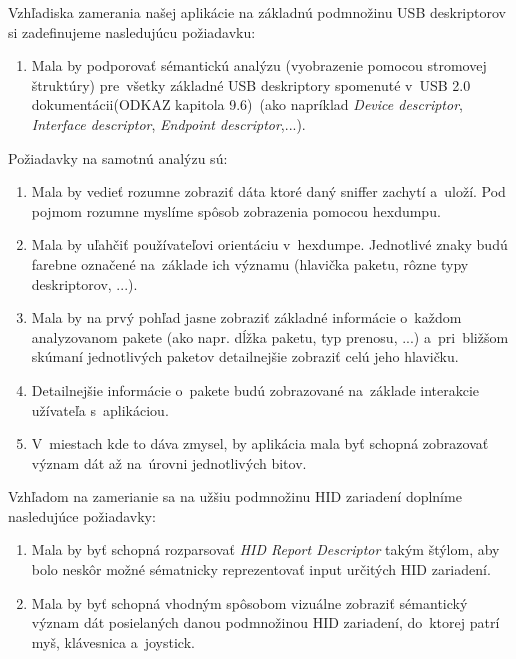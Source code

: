 Vzhľadiska zamerania našej aplikácie na základnú podmnožinu USB deskriptorov si zadefinujeme nasledujúcu požiadavku:
\begin{enumerate}[label=\textbf{P\arabic*},resume]
	\item \label{uvod:poz:deskriptory} Mala by podporovať sémantickú analýzu (vyobrazenie pomocou stromovej štruktúry) pre~všetky základné USB deskriptory spomenuté v~USB 2.0 dokumentácii(ODKAZ kapitola 9.6)~(ako napríklad \textit{Device descriptor}, \textit{Interface descriptor}, \textit{Endpoint descriptor},...).
\end{enumerate}

Požiadavky na samotnú analýzu sú:
\begin{enumerate}[label=\textbf{P\arabic*},resume]
	\item \label{uvod:poz:hexdump} Mala by vedieť rozumne zobraziť dáta ktoré daný sniffer zachytí a~uloží. Pod pojmom rozumne myslíme spôsob zobrazenia pomocou hexdumpu.
	\item \label{uvod:poz:data_highlight} Mala by uľahčiť používateľovi orientáciu v~hexdumpe. Jednotlivé znaky budú farebne označené na~základe ich významu (hlavička paketu, rôzne typy deskriptorov, ...).
	\item \label{uvod:poz:zobrazenie_paketov} Mala by na prvý pohľad jasne zobraziť základné informácie o~každom analyzovanom pakete (ako napr. dĺžka paketu, typ prenosu, ...) a~pri~bližšom skúmaní jednotlivých paketov detailnejšie zobraziť celú jeho hlavičku.
	\item \label{uvod:poz:paket_detail} Detailnejšie informácie o~pakete budú zobrazované na~základe interakcie užívateľa s~aplikáciou.
	\item \label{uvod:poz:show_bits} V~miestach kde to dáva zmysel, by aplikácia mala byť schopná zobrazovať význam dát až na~úrovni jednotlivých bitov.
\end{enumerate}

Vzhľadom na zamerianie sa na užšiu podmnožinu HID zariadení doplníme nasledujúce požiadavky:
\begin{enumerate}[label=\textbf{P\arabic*},resume]
	\item \label{uvod:poz:report_desk_parser} Mala by byť schopná rozparsovať \textit{HID Report Descriptor} takým štýlom, aby bolo neskôr možné sématnicky reprezentovať input určitých HID zariadení.
	\item \label{uvod:poz:hid_analyza} Mala by byť schopná vhodným spôsobom vizuálne zobraziť sémantický význam dát posielaných danou podmnožinou HID zariadení, do~ktorej patrí myš, klávesnica a~joystick.
\end{enumerate}

